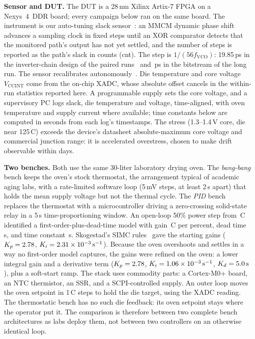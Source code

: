 \documentclass[10pt,twocolumn]{article}
\newcommand{\degC}{\,\textdegree C}
\newcommand{\unit}[1]{\,\mathrm{#1}}
\begin{document}
\textbf{Sensor and DUT.} The DUT is a 28\,nm Xilinx Artix-7 FPGA on a Nexys~4~DDR board; every campaign below ran on the same board. The instrument is our auto-tuning slack sensor~\cite{sbcci25}: an MMCM dynamic phase shift advances a sampling clock in fixed steps until an XOR comparator detects that the monitored path's output has not yet settled, and the number of steps is reported as the path's slack in counts (cnt). The step is $1/(56f_{\mathrm{VCO}})$: 19.85\,ps in the inverter-chain design of the paired runs~\cite{sbcci26} and \vPsRCA\,ps in the bitstream of the long run. The sensor recalibrates autonomously~\cite{sbcci25}. Die temperature and core voltage $V_{\mathrm{CCINT}}$ come from the on-chip XADC, whose absolute offset cancels in the within-run statistics reported here. A programmable supply sets the core voltage, and a supervisory PC logs slack, die temperature and voltage, time-aligned, with oven temperature and supply current where available; time constants below are computed in seconds from each log's timestamps. The stress (1.3--1.4\,V core, die near 125\degC) exceeds the device's datasheet absolute-maximum core voltage and commercial junction range: it is accelerated overstress, chosen to make drift observable within days.

\textbf{Two benches.} Both use the same 30-liter laboratory drying oven. The \emph{bang-bang} bench keeps the oven's stock thermostat, the arrangement typical of academic aging labs, with a rate-limited software loop (5\,mV steps, at least 2\,s apart) that holds the mean supply voltage but not the thermal cycle. The \emph{PID} bench replaces the thermostat with a microcontroller driving a zero-crossing solid-state relay in a 5\,s time-proportioning window. An open-loop 50\% power step from \vFopdtTzero\degC{} identified a first-order-plus-dead-time model with gain \vFopdtK\degC{} per percent, dead time \vFopdtTheta\,s, and time constant \vFopdtTau\,s. Skogestad's SIMC rules~\cite{simc} gave the starting gains ($K_p=2.78$, $K_i=\vSimcKiE\times10^{-3}\unit{s^{-1}}$). Because the oven overshoots and settles in a way no first-order model captures, the gains were refined on the oven: a lower integral gain and a derivative term ($K_p=2.78$, $K_i=\vFinalKiE\times10^{-3}\unit{s^{-1}}$, $K_d=\vFinalKd\unit{s}$), plus a soft-start ramp. The stack uses commodity parts: a Cortex-M0+ board, an NTC thermistor, an SSR, and a SCPI-controlled supply. An outer loop moves the oven setpoint in 1\degC{} steps to hold the die target, using the XADC reading. The thermostatic bench has no such die feedback: its oven setpoint stays where the operator put it. The comparison is therefore between two complete bench architectures as labs deploy them, not between two controllers on an otherwise identical loop.
\end{document}
